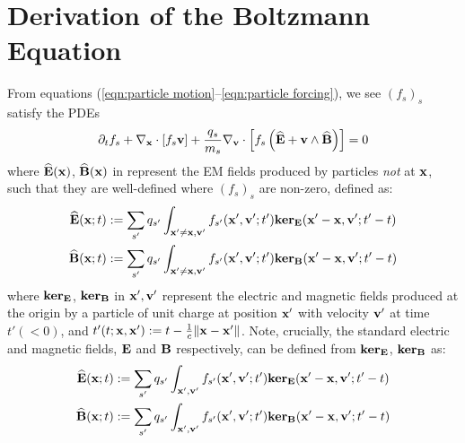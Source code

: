 \chapter{Derivation of the Boltzmann Equation}\label{sec:Boltzmann equation derivation}
    From equations (\ref{eqn:particle motion}–\ref{eqn:particle forcing}), we see $(f_{s})_{s}$ satisfy the PDEs
    \begin{equation}\label{eqn:exact Boltzmann equation}
        \partial_{t}f_{s} + \nabla_{\mathbf{x}}\cdot[f_{s}\mathbf{v}] + \frac{q_{s}}{m_{s}}\nabla_{\mathbf{v}}\cdot\left[f_{s}\left(\widehat{\mathbf{E}} + \mathbf{v}\wedge\widehat{\mathbf{B}}\right)\right]  =  0
    \end{equation}
    where $\widehat{\mathbf{E}}(\mathbf{x})$, $\widehat{\mathbf{B}}(\mathbf{x})$ in represent the EM fields produced by particles \emph{not} at $\mathbf{x}$, such that they are well-defined where $(f_{s})_{s}$ are non-zero, defined as:
    \begin{align}
        \widehat{\mathbf{E}}(\mathbf{x}; t)  &:=  \sum_{s'}q_{s'}\int_{\mathbf{x}' \neq \mathbf{x}, \mathbf{v}'}f_{s'}(\mathbf{x}', \mathbf{v}'; t'){\bf ker}_{\mathbf{E}}(\mathbf{x}' - \mathbf{x}, \mathbf{v}'; t' - t)  \\
        \widehat{\mathbf{B}}(\mathbf{x}; t)  &:=  \sum_{s'}q_{s'}\int_{\mathbf{x}' \neq \mathbf{x}, \mathbf{v}'}f_{s'}(\mathbf{x}', \mathbf{v}'; t'){\bf ker}_{\mathbf{B}}(\mathbf{x}' - \mathbf{x}, \mathbf{v}'; t' - t)  \\
    \end{align}
    where ${\bf ker}_{\mathbf{E}}$, ${\bf ker}_{\mathbf{B}}$ in $\mathbf{x}', \mathbf{v}'$ represent the electric and magnetic fields produced at the origin by a particle of unit charge at position $\mathbf{x}'$ with velocity $\mathbf{v}'$ at time $t' (< 0)$, and $t'(t; \mathbf{x}, \mathbf{x}') := t - \frac{1}{c}\|\mathbf{x} - \mathbf{x}'\|$. Note, crucially, the standard electric and magnetic fields, $\mathbf{E}$ and $\mathbf{B}$ respectively, can be defined from ${\bf ker}_{\mathbf{E}}$, ${\bf ker}_{\mathbf{B}}$ as:
    \begin{align}
        \widehat{\mathbf{E}}(\mathbf{x}; t)  &:=  \sum_{s'}q_{s'}\int_{\mathbf{x}', \mathbf{v}'}f_{s'}(\mathbf{x}', \mathbf{v}'; t'){\bf ker}_{\mathbf{E}}(\mathbf{x}' - \mathbf{x}, \mathbf{v}'; t' - t)  \\
        \widehat{\mathbf{B}}(\mathbf{x}; t)  &:=  \sum_{s'}q_{s'}\int_{\mathbf{x}', \mathbf{v}'}f_{s'}(\mathbf{x}', \mathbf{v}'; t'){\bf ker}_{\mathbf{B}}(\mathbf{x}' - \mathbf{x}, \mathbf{v}'; t' - t)  \\
    \end{align}

